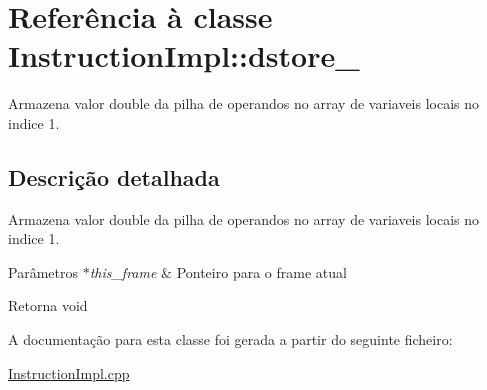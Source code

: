 \hypertarget{class_instruction_impl_1_1dstore__1}{}\section{Referência à classe Instruction\+Impl\+:\+:dstore\+\_}
\label{class_instruction_impl_1_1dstore__1}


Armazena valor double da pilha de operandos no array de variaveis locais no indice 1.  




\subsection{Descrição detalhada}
Armazena valor double da pilha de operandos no array de variaveis locais no indice 1. 


\begin{DoxyParams}{Parâmetros}
{\em $\ast$this\+\_\+frame} & Ponteiro para o frame atual \\
\hline
\end{DoxyParams}
\begin{DoxyReturn}{Retorna}
void 
\end{DoxyReturn}


A documentação para esta classe foi gerada a partir do seguinte ficheiro\+:\begin{DoxyCompactItemize}
\item 
\hyperlink{_instruction_impl_8cpp}{Instruction\+Impl.\+cpp}\end{DoxyCompactItemize}
